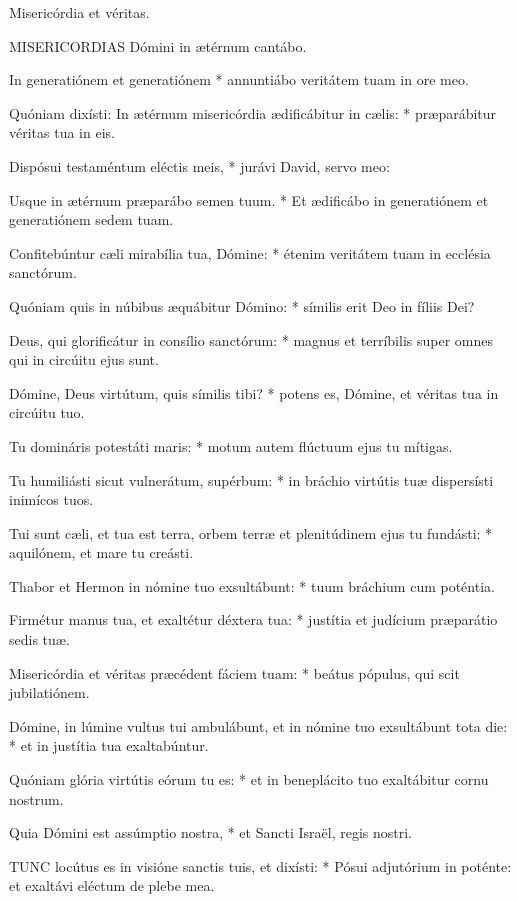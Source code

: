  Misericórdia et véritas.


\lettrine[lines=2]{M}{ISERICORDIAS} Dómini in ætérnum cantábo.

In generatiónem et generatiónem * annuntiábo veritátem tuam in ore meo.

Quóniam dixísti: In ætérnum misericórdia ædificábitur in cælis: * præparábitur véritas tua in eis.

Dispósui testaméntum eléctis meis, * jurávi David, servo meo:

Usque in ætérnum præparábo semen tuum. * Et ædificábo in generatiónem et generatiónem sedem tuam.

Confitebúntur cæli mirabília tua, Dómine: * étenim veritátem tuam in ecclésia sanctórum.

Quóniam quis in núbibus æquábitur Dómino: * símilis erit Deo in fíliis Dei?

Deus, qui glorificátur in consílio sanctórum: * magnus et terríbilis super omnes qui in circúitu ejus sunt.

Dómine, Deus virtútum, quis símilis tibi? * potens es, Dómine, et véritas tua in circúitu tuo.

Tu domináris potestáti maris: * motum autem flúctuum ejus tu mítigas.

Tu humiliásti sicut vulnerátum, supérbum: * in bráchio virtútis tuæ dispersísti inimícos tuos.

Tui sunt cæli, et tua est terra, orbem terræ et plenitúdinem ejus tu fundásti: * aquilónem, et mare tu creásti.

Thabor et Hermon in nómine tuo exsultábunt: * tuum bráchium cum poténtia.

Firmétur manus tua, et exaltétur déxtera tua: * justítia et judícium præparátio sedis tuæ.

Misericórdia et véritas præcédent fáciem tuam: * beátus pópulus, qui scit jubilatiónem.

Dómine, in lúmine vultus tui ambulábunt, et in nómine tuo exsultábunt tota die: * et in justítia tua exaltabúntur.

Quóniam glória virtútis eórum tu es: * et in beneplácito tuo exaltábitur cornu nostrum.

Quia Dómini est assúmptio nostra, * et Sancti Israël, regis nostri.


\lettrine[lines=2]{T}{UNC} locútus es in visióne sanctis tuis, et dixísti: * Pósui adjutórium in poténte: et exaltávi eléctum de plebe mea.

